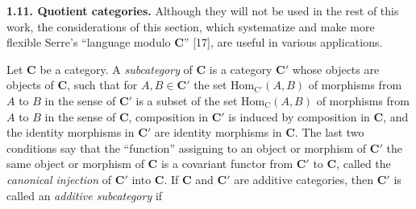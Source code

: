 \textbf{1.11. Quotient categories.} Although they will not be used in
the rest of this work, the considerations of this section, which systematize
and make more flexible Serre's ``language modulo $\mathbf{C}$'' [17], are useful in
various applications.

Let $\mathbf{C}$ be a category. A \textit{subcategory} of $\mathbf{C}$ is a category $\mathbf{C}'$ whose
objects are objects of $\mathbf{C}$, such that for $A,B\in \mathbf{C}'$ the set
$\mathrm{Hom}_{\mathrm{C}'}(A,B)$ of morphisms from $A$ to $B$ in the sense of $\mathbf{C}'$ is
a subset of the set $\mathrm{Hom}_{\mathrm{C}}(A,B)$ of morphisms from $A$ to $B$ in the
sense of $\mathbf{C}$, composition in $\mathbf{C}'$ is induced by composition in $\mathbf{C}$, and the
identity morphisms in $\mathbf{C}'$ are identity morphisms in $\mathbf{C}$. The last two
conditions say that the ``function'' assigning to an object or morphism of
$\mathbf{C}'$ the same object or morphism of $\mathbf{C}$ is a covariant functor from $\mathbf{C}'$ to
$\mathbf{C}$, called the \textit{canonical injection} of $\mathbf{C}'$ into $\mathbf{C}$. If $\mathbf{C}$ and
$\mathbf{C}'$ are additive categories, then $\mathbf{C}'$ is called an \textit{additive
subcategory} if

